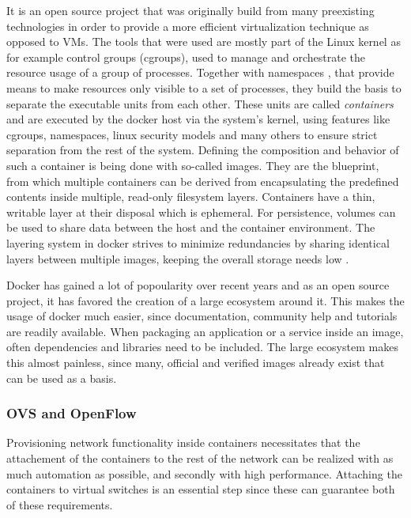 It is an open source project that was originally build from many preexisting technologies in order to provide a more efficient virtualization technique as opposed to VMs. The tools that were used are mostly part of the Linux kernel as for example control groups (cgroups), used to manage and orchestrate the resource usage of a group of processes. Together with namespaces , that provide means to make resources only visible to a set of processes, they build the basis to separate the executable units from each other. These units are called \textit{containers} and are executed by the docker host via the system's kernel, using features like cgroups, namespaces, linux security models and many others to ensure strict separation from the rest of the system. Defining the composition and behavior of such a container is being done with so-called images. They are the blueprint, from which multiple containers can be derived from encapsulating the predefined contents inside multiple, read-only filesystem layers. Containers have a thin, writable layer at their disposal which is ephemeral. For persistence, volumes can be used to share data between the host and the container environment. The layering system in docker strives to minimize redundancies by sharing identical layers between multiple images, keeping the overall storage needs low \cite{fink2014docker} \cite{morabito2015hypervisors}.

Docker has gained a lot of popoularity over recent years and as an open source project, it has favored the creation of a large ecosystem around it. This makes the usage of docker much easier, since documentation, community help and tutorials are readily available. When packaging an application or a service inside an image, often dependencies and libraries need to be included. The large ecosystem makes this almost painless, since many, official and verified images already exist that can be used as a basis.

\subsubsection{OVS and OpenFlow}
Provisioning network functionality inside containers necessitates that the attachement of the containers to the rest of the network can be realized with as much automation as possible, and secondly with high performance. Attaching the containers to virtual switches is an essential step since these can guarantee both of these requirements. 

